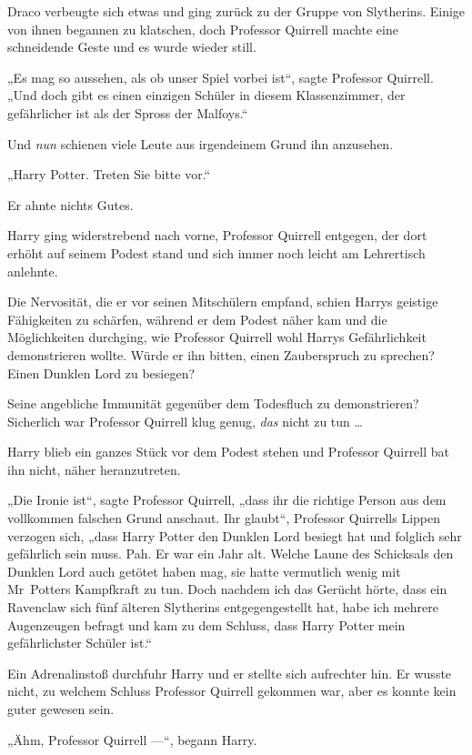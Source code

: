 {Draco verbeugte sich etwas und ging zurück zu der Gruppe von Slytherins. Einige von ihnen begannen zu klatschen, doch Professor Quirrell machte eine schneidende Geste und es wurde wieder still.

„Es mag so aussehen, als ob unser Spiel vorbei ist“, sagte Professor Quirrell. „Und doch gibt es einen einzigen Schüler in diesem Klassenzimmer, der gefährlicher ist als der Spross der Malfoys.“

Und \emph{nun} schienen viele Leute aus irgendeinem Grund ihn anzusehen.

„Harry Potter. Treten Sie bitte vor.“

Er ahnte nichts Gutes.

Harry ging widerstrebend nach vorne, Professor Quirrell entgegen, der dort erhöht auf seinem Podest stand und sich immer noch leicht am Lehrertisch anlehnte.

Die Nervosität, die er vor seinen Mitschülern empfand, schien Harrys geistige Fähigkeiten zu schärfen, während er dem Podest näher kam und die Möglichkeiten durchging, wie Professor Quirrell wohl Harrys Gefährlichkeit demonstrieren wollte. Würde er ihn bitten, einen Zauberspruch zu sprechen? Einen Dunklen Lord zu besiegen?

Seine angebliche Immunität gegenüber dem Todesfluch zu demonstrieren? Sicherlich war Professor Quirrell klug genug, \emph{das} nicht zu tun …

Harry blieb ein ganzes Stück vor dem Podest stehen und Professor Quirrell bat ihn nicht, näher heranzutreten.

„Die Ironie ist“, sagte Professor Quirrell, „dass ihr die richtige Person aus dem vollkommen falschen Grund anschaut. Ihr glaubt“, Professor Quirrells Lippen verzogen sich, „dass Harry Potter den Dunklen Lord besiegt hat und folglich sehr gefährlich sein muss. Pah. Er war ein Jahr alt. Welche Laune des Schicksals den Dunklen Lord auch getötet haben mag, sie hatte vermutlich wenig mit Mr~Potters Kampfkraft zu tun. Doch nachdem ich das Gerücht hörte, dass ein Ravenclaw sich fünf älteren Slytherins entgegengestellt hat, habe ich mehrere Augenzeugen befragt und kam zu dem Schluss, dass Harry Potter mein gefährlichster Schüler ist.“

Ein Adrenalinstoß durchfuhr Harry und er stellte sich aufrechter hin. Er wusste nicht, zu welchem Schluss Professor Quirrell gekommen war, aber es konnte kein guter gewesen sein.

„Ähm, Professor Quirrell —“, begann Harry.

}
